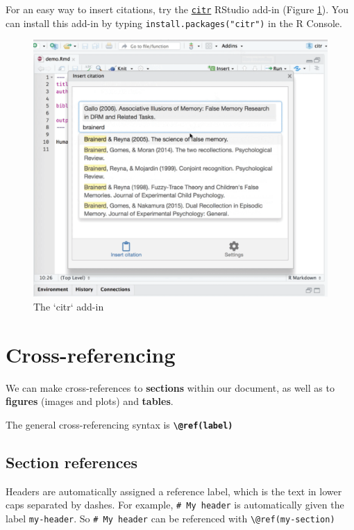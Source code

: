 \documentclass[a4paper, nobind]{templates/ociamthesis}
\begin{document}
For an easy way to insert citations, try the \href{https://github.com/crsh/citr}{\texttt{citr}} RStudio add-in (Figure \ref{fig:citr}).
You can install this add-in by typing \texttt{install.packages("citr")} in the R Console.

\begin{figure}

{\centering \includegraphics[width=0.8\linewidth]{figures/sample-content/citr} 

}

\caption{The `citr` add-in}\label{fig:citr}
\end{figure}

\hypertarget{cross-referencing}{%
\section{Cross-referencing}\label{cross-referencing}}

We can make cross-references to \textbf{sections} within our document, as well as to \textbf{figures} (images and plots) and \textbf{tables}.

The general cross-referencing syntax is \textbf{\texttt{\textbackslash{}@ref(label)}}

\hypertarget{section-references}{%
\subsection{Section references}\label{section-references}}

Headers are automatically assigned a reference label, which is the text in lower caps separated by dashes. For example, \texttt{\#\ My\ header} is automatically given the label \texttt{my-header}. So \texttt{\#\ My\ header} can be referenced with \texttt{\textbackslash{}@ref(my-section)}
\end{document}
